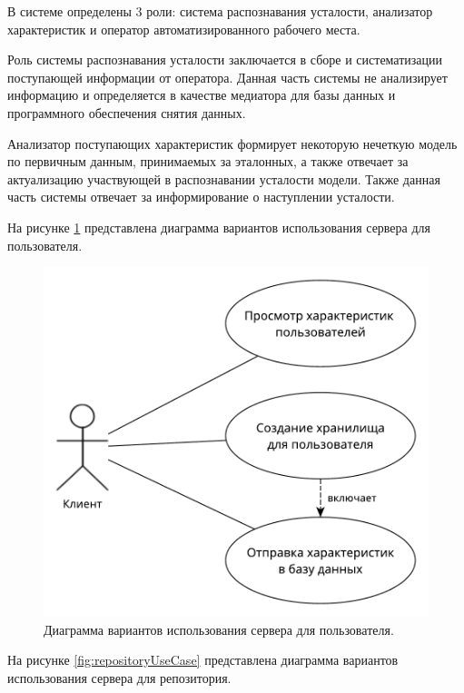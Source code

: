 В системе определены 3 роли: система распознавания усталости, анализатор характеристик и оператор автоматизированного рабочего места.

Роль системы распознавания усталости заключается в сборе и систематизации поступающей информации от оператора. Данная часть системы не анализирует информацию и определяется в качестве медиатора для базы данных и программного обеспечения снятия данных.

Анализатор поступающих характеристик формирует некоторую нечеткую модель по первичным данным, принимаемых за эталонных, а также отвечает за актуализацию участвующей в распознавании усталости модели. Также данная часть системы отвечает за информирование о наступлении усталости.

На рисунке \ref{fig:userUseCase} представлена диаграмма вариантов использования сервера для пользователя.

\begin{figure}[H]
	\centering
	\includegraphics[width=\textwidth]{img/useCaseClient.pdf}
	\caption{Диаграмма вариантов использования сервера для пользователя.}
	\label{fig:userUseCase}
\end{figure}

На рисунке \ref{fig:repositoryUseCase} представлена диаграмма вариантов использования сервера для репозитория.

